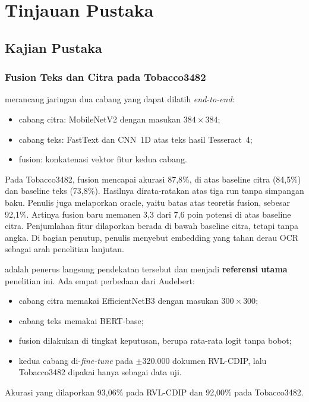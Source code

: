 \section{Tinjauan Pustaka}\label{sec:tinjauan}

\subsection{Kajian Pustaka}\label{sec:kajian-pustaka}

\subsubsection{Fusion Teks dan Citra pada Tobacco3482}

\textcite{audebert2020} merancang jaringan dua cabang yang dapat dilatih
\textit{end-to-end}:
\begin{itemize}
  \item cabang citra: MobileNetV2 dengan masukan $384\times384$;
  \item cabang teks: FastText dan CNN~1D atas teks hasil Tesseract~4;
  \item fusion: konkatenasi vektor fitur kedua cabang.
\end{itemize}
Pada Tobacco3482, fusion mencapai akurasi 87,8\%, di atas baseline citra (84,5\%) dan
baseline teks (73,8\%). Hasilnya dirata-ratakan atas tiga run tanpa simpangan baku.
Penulis juga melaporkan oracle, yaitu batas atas teoretis fusion, sebesar 92,1\%. Artinya
fusion baru memanen 3,3 dari 7,6 poin potensi di atas baseline citra. Penjumlahan fitur
dilaporkan berada di bawah baseline citra, tetapi tanpa angka. Di bagian penutup, penulis
menyebut embedding yang tahan derau OCR sebagai arah penelitian lanjutan.

\textcite{kashyap2026} adalah penerus langsung pendekatan tersebut dan menjadi
\textbf{referensi utama} penelitian ini. Ada empat perbedaan dari Audebert:
\begin{itemize}
  \item cabang citra memakai EfficientNetB3 dengan masukan $300\times300$;
  \item cabang teks memakai BERT-base;
  \item fusion dilakukan di tingkat keputusan, berupa rata-rata logit tanpa bobot;
  \item kedua cabang di-\textit{fine-tune} pada $\pm$320.000 dokumen RVL-CDIP, lalu
  Tobacco3482 dipakai hanya sebagai data uji.
\end{itemize}
Akurasi yang dilaporkan 93,06\% pada RVL-CDIP dan 92,00\% pada Tobacco3482.

